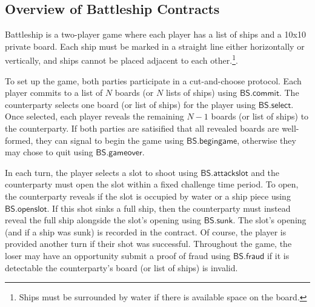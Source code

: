 \documentclass{llncs}
\newcommand{\battleshipfraud}{\mathsf{BS.fraud}}
\newcommand{\battleshipattackslot}{\mathsf{BS.attackslot}}
\newcommand{\battleshipbegin}{\mathsf{BS.begingame}}
\newcommand{\battleshipcommit}{\mathsf{BS.commit}}
\newcommand{\battleshipselectboard}{\mathsf{BS.select}}
\newcommand{\battleshiprevealslot}{\mathsf{BS.openslot}}
\newcommand{\battleshipsinking}{\mathsf{BS.sunk}}
\newcommand{\battleshipgameover}{\mathsf{BS.gameover}}
\begin{document}
\subsection{Overview of Battleship Contracts}

Battleship is a two-player game where each player has a list of ships and a 10x10 private board. 
Each ship must be marked in a straight line either horizontally or vertically, and ships cannot be placed adjacent to each other.\footnote{Ships must be surrounded by water if there is available space on the board.}.

To set up the game, both parties participate in a cut-and-choose protocol.
Each player commits to a list of $N$ boards (or $N$ lists of ships) using $\battleshipcommit$. 
The counterparty selects one board (or list of ships) for the player using $\battleshipselectboard$.
Once selected, each player reveals the remaining $N-1$ boards (or list of ships) to the counterparty. 
If both parties are satisified that all revealed boards are well-formed, they can signal to begin the game using $\battleshipbegin$, otherwise they may chose to quit using $\battleshipgameover$. 

In each turn, the player selects a slot to shoot using $\battleshipattackslot$ and the counterparty must open the slot  within a fixed challenge time period. 
To open, the counterparty reveals if the slot is occupied by water or a ship piece using $\battleshiprevealslot$.
If this shot sinks a full ship, then the counterparty must instead reveal the full ship alongside the slot's opening using $\battleshipsinking$. 
The slot's opening (and if a ship was sunk) is recorded in the contract. 
Of course, the player is provided another turn if their shot was successful.
Throughout the game, the loser may have an opportunity submit a proof of fraud using $\battleshipfraud$ if it is detectable the counterparty's board (or list of ships) is invalid. 
\end{document}

